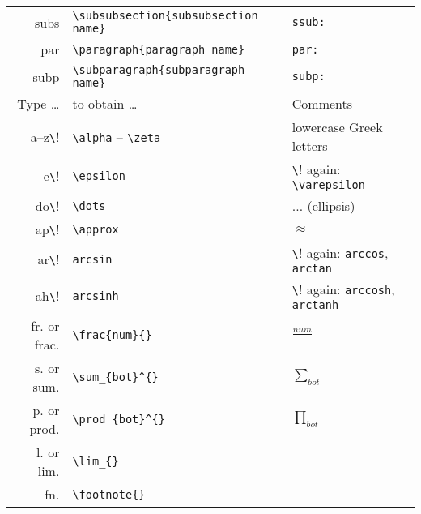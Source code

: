 \documentclass[10pt]{article}
\begin{document}
\begin{table}
\begin{tabular}{r|l|l}
	subs\tabkey       & \verb!\subsubsection{subsubsection name}!  & \texttt{ssub:}          \\
	par\tabkey        & \verb!\paragraph{paragraph name}!          & \texttt{par:}           \\
	subp\tabkey       & \verb!\subparagraph{subparagraph name}!    & \texttt{subp:}          \\
	\hline
	Type \dots                & to obtain \dots                  & Comments                                                      \\
	\hline
	a--z\cmdkey\verb!\!       & \verb!\alpha! -- \verb!\zeta!    & lowercase Greek letters                                       \\
	e\cmdkey\verb!\!          & \verb!\epsilon!                  & \cmdkey\verb!\! again: \verb!\varepsilon!                     \\
	do\cmdkey\verb!\!         & \verb!\dots!                     & $\dots$ (ellipsis)                                            \\
	ap\cmdkey\verb!\!         & \verb!\approx!                   & $\approx$                                                     \\
	ar\cmdkey\verb!\!         & \texttt{arcsin}                  & \cmdkey\verb!\! again: \texttt{arccos}, \texttt{arctan}       \\
	ah\cmdkey\verb!\!         & \texttt{arcsinh}                 & \cmdkey\verb!\! again: \texttt{arccosh}, \texttt{arctanh}     \\
	\hline
	fr\ctlkey\shiftkey. or frac\ctlkey\shiftkey.    & \verb!\frac{num}{}!              & $\frac{num}{}$      \\
	s\ctlkey\shiftkey. or sum\ctlkey\shiftkey.      & \verb!\sum_{bot}^{}!             & $\sum_{bot}^{}$     \\ 
	p\ctlkey\shiftkey. or prod\ctlkey\shiftkey.     & \verb!\prod_{bot}^{}!            & $\prod_{bot}^{}$    \\ 
	l\ctlkey\shiftkey. or lim\ctlkey\shiftkey.      & \verb!\lim_{}!                   &                     \\
	fn\ctlkey\shiftkey.                             & \verb!\footnote{}!               &                     \\ 

\end{tabular}
\end{table}
\end{document}
